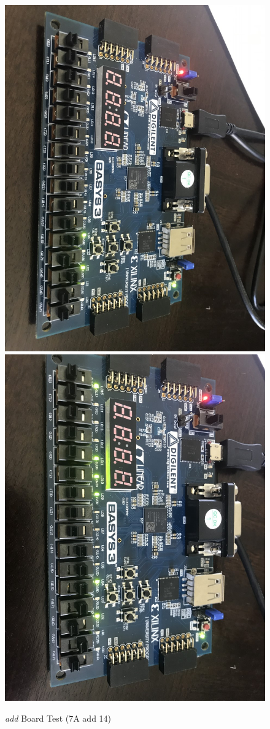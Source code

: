 \documentclass[11pt]{article}
\begin{document}
\begin{figure}[ht]\centering
	\includegraphics[angle=90, width=.8\textwidth]{add1}
	\includegraphics[angle=90, width=.8\textwidth]{add2}
	\caption{\textit{add} Board Test (7A add 14)}
	\label{fig:sim_with_table}
\end{figure}
\end{document}
